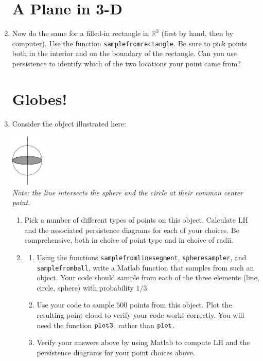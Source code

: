 \documentclass[12pt,twoside]{article}
\begin{document}
\begin{enumerate}
\pagebreak

\section{A Plane in 3-D}
      \item Now do the same for a filled-in rectangle in $\mathbb{R}^3$ (first by hand, then by computer).  Use the function \verb|samplefromrectangle|.  Be sure to pick points both in the interior and on the boundary of the rectangle.  Can you use persistence to identify which of the two locations your point came from?\vfill

      \pagebreak
\section{Globes!}
      \item Consider the object illustrated here:
      \begin{center}
         \includegraphics[height=1in]{sphere_circle_line}\\
         \emph{Note: the line intersects the sphere and the circle at their common center point.}
      \end{center}
      \begin{enumerate}
         \item Pick a number of different types of points on this object.  Calculate LH and the associated persistence diagrams for each of your choices.  Be comprehensive, both in choice of point type and in choice of radii.\vfill
         \item 
         \begin{enumerate}
           \item Using the functions \verb|samplefromlinesegment|, \verb|spheresampler|, and \verb|samplefromball|, write a Matlab function that samples from such an object. Your code should sample from each of the three elements (line, circle, sphere) with probability $1/3$.\\
         \item Use your code to sample $500$ points from this object.  Plot the resulting point cloud to verify your code works correctly.  You will need the function $\verb|plot3|$, rather than $\verb|plot|$.\\
         \item Verify your answers above by using Matlab to compute LH and the persistence diagrams for your point choices above.\\
        \end{enumerate}
      \end{enumerate}
  \end{enumerate}
\pagebreak       
\end{document}
